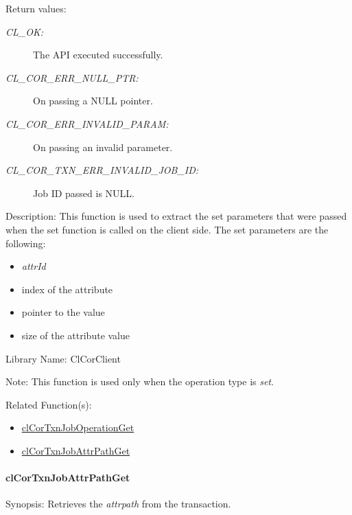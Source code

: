 \begin{Desc}
\item[Return values:]
\begin{description}
\item[{\em CL\_\-OK:}]The API executed successfully. \item[{\em CL\_\-COR\_\-ERR\_\-NULL\_\-PTR:}]On passing a NULL pointer. \item[{\em CL\_\-COR\_\-ERR\_\-INVALID\_\-PARAM:}]On passing an invalid parameter. \item[{\em CL\_\-COR\_\-TXN\_\-ERR\_\-INVALID\_\-JOB\_\-ID:}]Job ID passed is NULL.\end{description}
\end{Desc}
\begin{Desc}
\item[Description:]This function is used to extract the set parameters that were passed when the set function is called on the client side. The set parameters are the following: \begin{itemize}
\item {\em attr\-Id\/} \item index of the attribute \item pointer to the value \item size of the attribute value\end{itemize}
\end{Desc}
\begin{Desc}
\item[Library Name:]Cl\-Cor\-Client\end{Desc}
\begin{Desc}
\item[Note:]This function is used only when the operation type is {\em set\/}.\end{Desc}
\begin{Desc}
\item[Related Function(s):]\begin{itemize}
\item \hyperlink{group__group13}{cl\-Cor\-Txn\-Job\-Operation\-Get} \item \hyperlink{group__group13}{cl\-Cor\-Txn\-Job\-Attr\-Path\-Get} \end{itemize}
\end{Desc}
\hypertarget{pagecor508}{}\paragraph{cl\-Cor\-Txn\-Job\-Attr\-Path\-Get}\label{pagecor508}
\begin{Desc}
\item[Synopsis:]Retrieves the {\em attrpath\/} from the transaction.\end{Desc}

